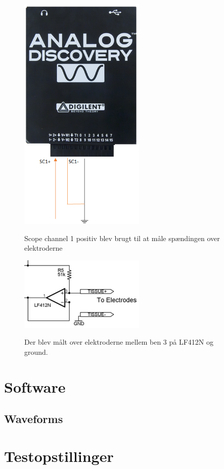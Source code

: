 \begin{figure}[H]
\centering
{\includegraphics[width=6cm]
{Figure/adkonverter}}
\caption{Scope channel 1 positiv blev brugt til at måle spændingen over elektroderne}
\label{fig:adkonverter}
\end{figure}

\begin{figure}[H]
\centering
{\includegraphics[width=6cm]
{Figure/elektroderdia}}
\caption{Der blev målt over elektroderne mellem ben 3 på LF412N og ground.}
\label{fig:elektroderdia}
\end{figure}

\section{Software}
\subsection{Waveforms}

\section{Testopstillinger}
